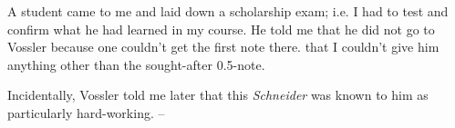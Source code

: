 A student came to me and laid down a scholarship exam; i.e. I had to test and confirm what he had learned in my course. He told me that he did not go to Vossler because one couldn't get the first note there.  that I couldn't give him anything other than the sought-after 0.5-note.

Incidentally, Vossler told me later that this \textit{Schneider} was known to him as particularly hard-working. -- \missing


